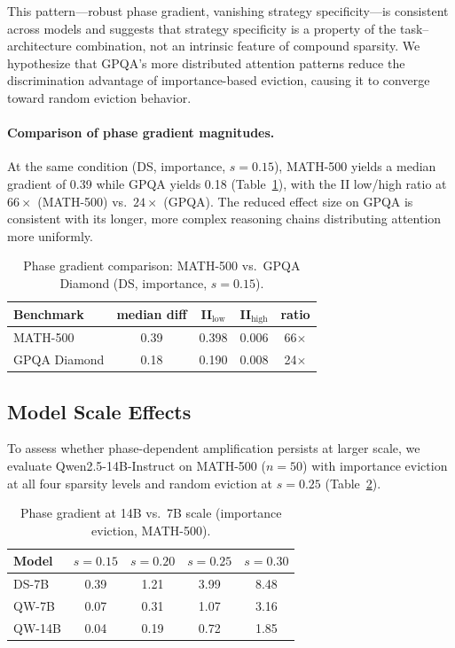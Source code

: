 \documentclass[11pt,a4paper]{article}
\begin{document}
This pattern---robust phase gradient, vanishing strategy specificity---is consistent across models and suggests that strategy specificity is a property of the task--architecture combination, not an intrinsic feature of compound sparsity. We hypothesize that GPQA's more distributed attention patterns reduce the discrimination advantage of importance-based eviction, causing it to converge toward random eviction behavior.

\paragraph{Comparison of phase gradient magnitudes.}
At the same condition (DS, importance, $s=0.15$), MATH-500 yields a median gradient of 0.39 while GPQA yields 0.18 (Table~\ref{tab:gpqa_vs_math}), with the II low/high ratio at $66\times$ (MATH-500) vs.\ $24\times$ (GPQA). The reduced effect size on GPQA is consistent with its longer, more complex reasoning chains distributing attention more uniformly.

\begin{table}[t]
\centering
\small
\caption{Phase gradient comparison: MATH-500 vs.\ GPQA Diamond (DS, importance, $s=0.15$).}
\label{tab:gpqa_vs_math}
\begin{tabular}{lcccc}
\toprule
Benchmark & median diff & II$_{\text{low}}$ & II$_{\text{high}}$ & ratio \\
\midrule
MATH-500 & 0.39 & 0.398 & 0.006 & 66$\times$ \\
GPQA Diamond & 0.18 & 0.190 & 0.008 & 24$\times$ \\
\bottomrule
\end{tabular}
\end{table}

\subsection{Model Scale Effects}
\label{sec:scale}

To assess whether phase-dependent amplification persists at larger scale, we evaluate Qwen2.5-14B-Instruct on MATH-500 ($n=50$) with importance eviction at all four sparsity levels and random eviction at $s=0.25$ (Table~\ref{tab:14b}).

\begin{table}[t]
\centering
\small
\caption{Phase gradient at 14B vs.\ 7B scale (importance eviction, MATH-500).}
\label{tab:14b}
\begin{tabular}{lcccc}
\toprule
Model & $s{=}0.15$ & $s{=}0.20$ & $s{=}0.25$ & $s{=}0.30$ \\
\midrule
DS-7B & 0.39 & 1.21 & 3.99 & 8.48 \\
QW-7B & 0.07 & 0.31 & 1.07 & 3.16 \\
QW-14B & 0.04 & 0.19 & 0.72 & 1.85 \\
\bottomrule
\end{tabular}
\end{table}
\end{document}
